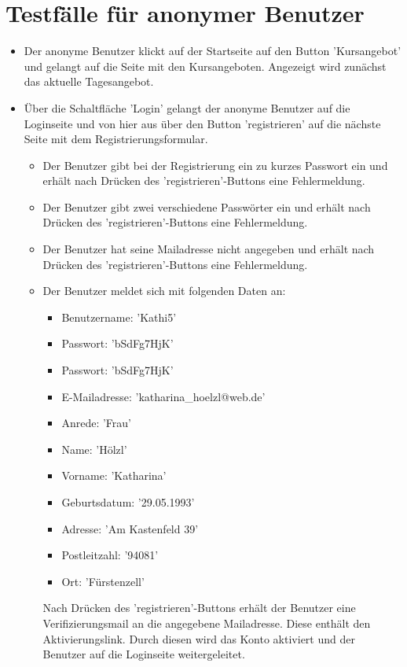 \documentclass[a4paper]{scrreprt}
\newcounter{Lc}
\newcounter{Hc}
\newcommand{\stepHc}{\stepcounter{Hc}\setcounter{Lc}{0}}
\begin{document}
	\section{Testfälle für anonymer Benutzer}
			\stepHc
			\begin{itemize}
				\item {} 
				Der anonyme Benutzer klickt auf der Startseite auf den Button 'Kursangebot'	und gelangt auf die Seite mit den Kursangeboten. Angezeigt wird zunächst das aktuelle Tagesangebot.	
				\item {} 
				Über die Schaltfläche 'Login' gelangt der anonyme Benutzer auf die Loginseite und von hier aus über den Button 'registrieren' auf die nächste Seite mit dem Registrierungsformular. 		
				\begin{itemize}
					\item Der Benutzer gibt bei der Registrierung ein zu kurzes Passwort ein und erhält nach Drücken des 'registrieren'-Buttons eine Fehlermeldung.	
					\item Der Benutzer gibt zwei verschiedene Passwörter ein und erhält nach Drücken des 'registrieren'-Buttons eine Fehlermeldung.
					\item Der Benutzer hat seine Mailadresse nicht angegeben und erhält nach Drücken des 'registrieren'-Buttons eine Fehlermeldung.	
					\item Der Benutzer meldet sich mit folgenden Daten an: 
						\begin{itemize}
							\item Benutzername: 'Kathi5'
							\item Passwort: 'bSdFg7HjK'
							\item Passwort: 'bSdFg7HjK'
							\item E-Mailadresse: 'katharina\_hoelzl@web.de'
							\item Anrede: 'Frau'
							\item Name: 'Hölzl'
							\item Vorname: 'Katharina'
							\item Geburtsdatum: '29.05.1993'
							\item Adresse: 'Am Kastenfeld 39'
							\item Postleitzahl: '94081'
							\item Ort: 'Fürstenzell'
						\end{itemize}
					Nach Drücken des 'registrieren'-Buttons erhält der Benutzer eine Verifizierungsmail an die angegebene Mailadresse. Diese enthält den Aktivierungslink. Durch diesen wird das Konto aktiviert und der Benutzer auf die Loginseite weitergeleitet.
				\end{itemize}
			\end{itemize}	
		
\end{document}
